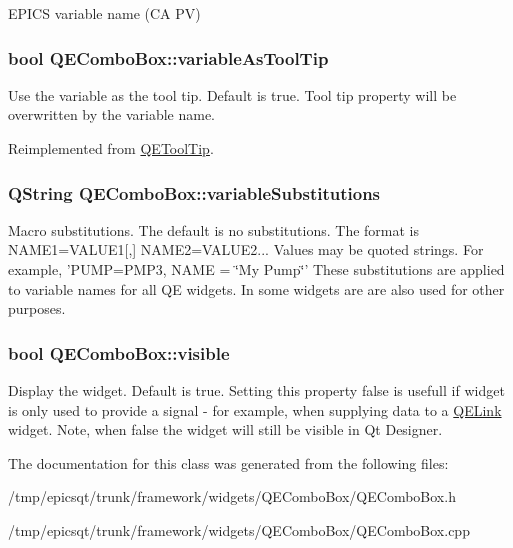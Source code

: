 \label{classQEComboBox_a6a0aa7f7d106b8133ea2711a9b93044c}
EPICS variable name (CA PV) \hypertarget{classQEComboBox_a25221727ff1f7f11a4805dbced197e8e}{
\subsubsection[{variableAsToolTip}]{\setlength{\rightskip}{0pt plus 5cm}bool QEComboBox::variableAsToolTip}}
\label{classQEComboBox_a25221727ff1f7f11a4805dbced197e8e}
Use the variable as the tool tip. Default is true. Tool tip property will be overwritten by the variable name. 

Reimplemented from \hyperlink{classQEToolTip}{QEToolTip}.

\hypertarget{classQEComboBox_a0a2d3ae0138aab89bddf83f759049766}{
\subsubsection[{variableSubstitutions}]{\setlength{\rightskip}{0pt plus 5cm}QString QEComboBox::variableSubstitutions}}
\label{classQEComboBox_a0a2d3ae0138aab89bddf83f759049766}
Macro substitutions. The default is no substitutions. The format is NAME1=VALUE1\mbox{[},\mbox{]} NAME2=VALUE2... Values may be quoted strings. For example, 'PUMP=PMP3, NAME = \char`\"{}My Pump\char`\"{}' These substitutions are applied to variable names for all QE widgets. In some widgets are are also used for other purposes. \hypertarget{classQEComboBox_a4c0cb5db5c7c6e8da384a566b533273f}{
\subsubsection[{visible}]{\setlength{\rightskip}{0pt plus 5cm}bool QEComboBox::visible}}
\label{classQEComboBox_a4c0cb5db5c7c6e8da384a566b533273f}
Display the widget. Default is true. Setting this property false is usefull if widget is only used to provide a signal -\/ for example, when supplying data to a \hyperlink{classQELink}{QELink} widget. Note, when false the widget will still be visible in Qt Designer. 

The documentation for this class was generated from the following files:\begin{DoxyCompactItemize}
\item 
/tmp/epicsqt/trunk/framework/widgets/QEComboBox/QEComboBox.h\item 
/tmp/epicsqt/trunk/framework/widgets/QEComboBox/QEComboBox.cpp\end{DoxyCompactItemize}

